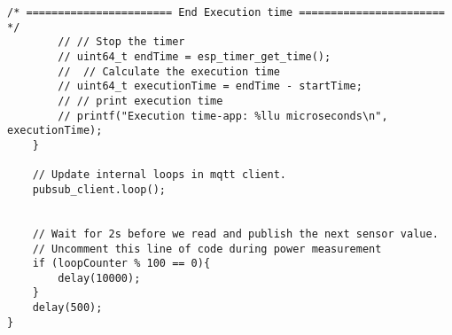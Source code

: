 \begin{lstlisting}[style=CStyle, caption={Main Source C File of The Proposed Implementation}, label={list:mainc-ascon}]
        /* ======================= End Execution time ======================= */
        // // Stop the timer
        // uint64_t endTime = esp_timer_get_time();
        //  // Calculate the execution time
        // uint64_t executionTime = endTime - startTime;
        // // print execution time
        // printf("Execution time-app: %llu microseconds\n", executionTime);
    }

    // Update internal loops in mqtt client.
    pubsub_client.loop();


    // Wait for 2s before we read and publish the next sensor value.
    // Uncomment this line of code during power measurement 
    if (loopCounter % 100 == 0){
        delay(10000);
    }
    delay(500);
}
\end{lstlisting}
